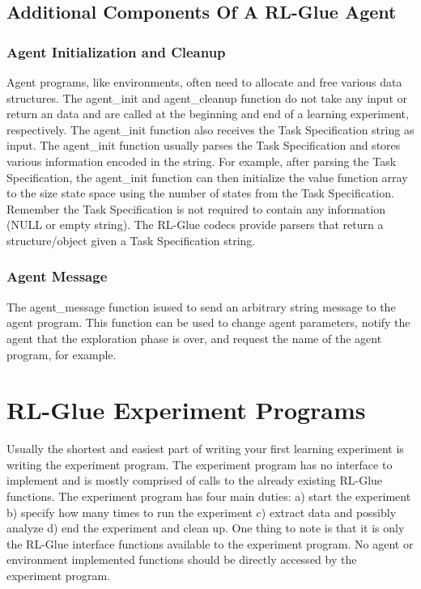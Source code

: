 \documentclass[11pt]{article}
\begin{document}
\subsection{Additional Components Of A RL-Glue Agent}
\label{agentp2}

\subsubsection{Agent Initialization and Cleanup}
Agent programs, like environments, often need to allocate and free various data structures. The agent\_init and agent\_cleanup function do not take any input or return an data and are called at the beginning and end of a learning experiment, respectively. The agent\_init function also receives the Task Specification string as input. The agent\_init function usually parses the Task Specification and stores various information encoded in the string. For example, after parsing the Task Specification, the agent\_init function can then initialize the value function array to the size state space using the number of states from the Task Specification. Remember the Task Specification is not required to contain any information (NULL or empty string). The RL-Glue codecs provide parsers that return a structure/object given a Task Specification string.     

\subsubsection{Agent Message}
The agent\_message function isused to send an arbitrary string message to the agent program. This function can be used to change agent parameters, notify the agent that the exploration phase is over, and request the name of the agent program, for example.



\section{RL-Glue Experiment Programs}
\label{exp}
Usually the shortest and easiest part of writing your first learning experiment is writing the experiment program. The experiment program has no interface to implement and is mostly comprised of calls to the already existing RL-Glue functions. The experiment program has four main duties: a) start the experiment b) specify how many times to run the experiment c) extract data and possibly analyze d) end the experiment and clean up.  One thing to note is that it is only the RL-Glue interface functions available to the experiment program. No agent or environment implemented functions should be directly accessed by the experiment program.
\end{document}
